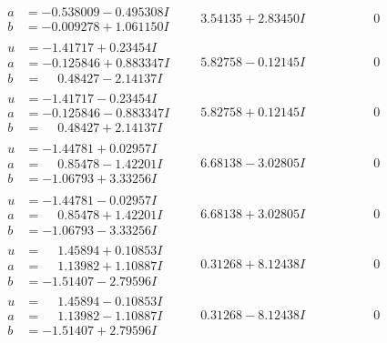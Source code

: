 \documentclass[1p]{elsarticle_modified}
\theoremstyle{definition}
\begin{document}
$$\begin{array}{c|c|c}
\begin{aligned}
a &= -0.538009 - 0.495308 I \\
b &= -0.009278 + 1.061150 I\end{aligned}
 & \phantom{-}3.54135 + 2.83450 I & \phantom{-0.000000 } 0 \\ \hline\begin{aligned}
u &= -1.41717 + 0.23454 I \\
a &= -0.125846 + 0.883347 I \\
b &= \phantom{-}0.48427 - 2.14137 I\end{aligned}
 & \phantom{-}5.82758 - 0.12145 I & \phantom{-0.000000 } 0 \\ \hline\begin{aligned}
u &= -1.41717 - 0.23454 I \\
a &= -0.125846 - 0.883347 I \\
b &= \phantom{-}0.48427 + 2.14137 I\end{aligned}
 & \phantom{-}5.82758 + 0.12145 I & \phantom{-0.000000 } 0 \\ \hline\begin{aligned}
u &= -1.44781 + 0.02957 I \\
a &= \phantom{-}0.85478 - 1.42201 I \\
b &= -1.06793 + 3.33256 I\end{aligned}
 & \phantom{-}6.68138 - 3.02805 I & \phantom{-0.000000 } 0 \\ \hline\begin{aligned}
u &= -1.44781 - 0.02957 I \\
a &= \phantom{-}0.85478 + 1.42201 I \\
b &= -1.06793 - 3.33256 I\end{aligned}
 & \phantom{-}6.68138 + 3.02805 I & \phantom{-0.000000 } 0 \\ \hline\begin{aligned}
u &= \phantom{-}1.45894 + 0.10853 I \\
a &= \phantom{-}1.13982 + 1.10887 I \\
b &= -1.51407 - 2.79596 I\end{aligned}
 & \phantom{-}0.31268 + 8.12438 I & \phantom{-0.000000 } 0 \\ \hline\begin{aligned}
u &= \phantom{-}1.45894 - 0.10853 I \\
a &= \phantom{-}1.13982 - 1.10887 I \\
b &= -1.51407 + 2.79596 I\end{aligned}
 & \phantom{-}0.31268 - 8.12438 I & \phantom{-0.000000 } 0 \\ \hline\begin{aligned}

\end{aligned}
\end{array}$$
\end{document}
